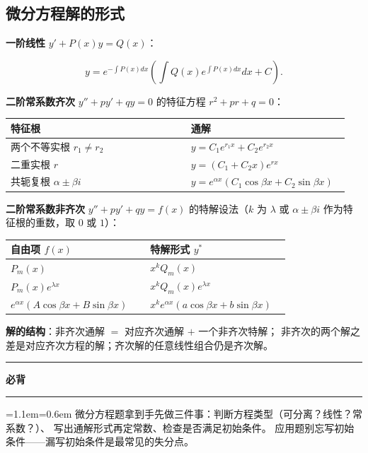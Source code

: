 \documentclass[11pt,openany,UTF8]{ctexbook}
\newcommand{\callouthead}[2]{%
  \par\addvspace{7pt}\noindent
  {\color{#1}\rule[-0.15em]{3pt}{1.05em}}\hspace{0.5em}%
  {\bfseries\color{#1}#2}\par\nobreak\vspace{-0.35em}%
  {\color{rulesep}\hrule height 0.4pt}\nobreak\vspace{0.45em}%
  \begingroup\small\setlength{\parindent}{0pt}%
  \leftskip=1.1em\rightskip=0.6em\noindent\ignorespaces}
\newcommand{\calloutend}{\par\endgroup\addvspace{7pt}}
\newenvironment{callkey}[1]{\callouthead{keybar}{#1}}{\calloutend}
\begin{document}
\subsection{微分方程解的形式}

\textbf{一阶线性} $y'+P(x)y=Q(x)$：

\[y=e^{-\int P(x)dx}\left(\int Q(x)e^{\int P(x)dx}dx+C\right).\]

\textbf{二阶常系数齐次} $y''+py'+qy=0$ 的特征方程 $r^2+pr+q=0$：

\begingroup\small\setlength{\tabcolsep}{4.0pt}
\begin{longtable}{@{}L{0.5138\linewidth}L{0.4319\linewidth}@{}}
\toprule
\textbf{特征根} & \textbf{通解} \\
\midrule
\endhead
两个不等实根 $r_1\ne r_2$ & $y=C_1e^{r_1x}+C_2e^{r_2x}$ \\
二重实根 $r$ & $y=(C_1+C_2x)e^{rx}$ \\
共轭复根 $\alpha\pm\beta i$ & $y=e^{\alpha x}(C_1\cos\beta x+C_2\sin\beta x)$ \\
\bottomrule
\end{longtable}
\endgroup

\textbf{二阶常系数非齐次} $y''+py'+qy=f(x)$ 的特解设法（$k$ 为 $\lambda$ 或 $\alpha\pm\beta i$ 作为特征根的重数，取 $0$ 或 $1$）：

\begingroup\small\setlength{\tabcolsep}{4.0pt}
\begin{longtable}{@{}L{0.4728\linewidth}L{0.4728\linewidth}@{}}
\toprule
\textbf{自由项 $f(x)$} & \textbf{特解形式 $y^*$} \\
\midrule
\endhead
$P_m(x)$ & $x^kQ_m(x)$ \\
$P_m(x)e^{\lambda x}$ & $x^kQ_m(x)e^{\lambda x}$ \\
$e^{\alpha x}(A\cos\beta x+B\sin\beta x)$ & $x^ke^{\alpha x}(a\cos\beta x+b\sin\beta x)$ \\
\bottomrule
\end{longtable}
\endgroup

\textbf{解的结构}：非齐次通解 $=$ 对应齐次通解 $+$ 一个非齐次特解； 非齐次的两个解之差是对应齐次方程的解；齐次解的任意线性组合仍是齐次解。

\begin{callkey}{必背}
微分方程题拿到手先做三件事：判断方程类型（可分离？线性？常系数？）、 写出通解形式再定常数、检查是否满足初始条件。 应用题别忘写初始条件——漏写初始条件是最常见的失分点。

\end{callkey}
\end{document}
